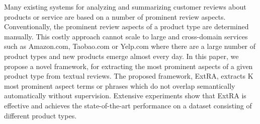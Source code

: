 Many existing systems for analyzing and summarizing customer reviews about products or service are based on a number of prominent review aspects. Conventionally, the prominent review aspects of a product type are determined manually. This costly approach cannot scale to large and cross-domain services such as Amazon.com, Taobao.com or Yelp.com where there are a large number of product types and new products emerge almost every day. In this paper, we propose a novel framework, for extracting the most prominent aspects of a given product type from textual reviews. The proposed framework, ExtRA, extracts K most prominent aspect terms or phrases which do not overlap semantically automatically without supervision. Extensive experiments show that ExtRA is effective and achieves the state-of-the-art performance on a dataset consisting of different product types.
